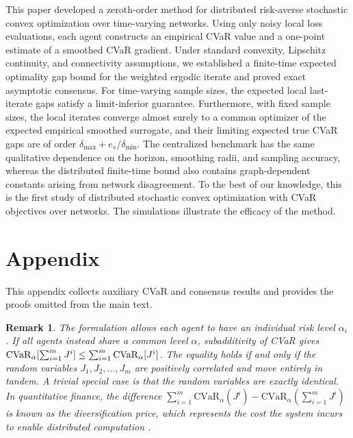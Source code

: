 \documentclass[twocolumn]{autart}    %
\newtheorem{remark}{Remark}
\newcommand{\1}{\mathbf{1}}
\begin{document}
This paper developed a zeroth-order method for distributed risk-averse stochastic convex optimization over time-varying networks. 
Using only noisy local loss evaluations, 
each agent constructs an empirical CVaR value and a one-point estimate of a smoothed CVaR gradient. 
Under standard convexity, Lipschitz continuity, and connectivity assumptions, 
we established a finite-time expected optimality gap bound for the weighted ergodic iterate and proved exact asymptotic consensus. 
For time-varying sample sizes, the expected local last-iterate gaps satisfy a limit-inferior guarantee. 
Furthermore, with fixed sample sizes, 
the local iterates converge almost surely to a common optimizer of the expected empirical smoothed surrogate, 
and their limiting expected true CVaR gaps are of order $\delta_{\max}+e_s/\delta_{\min}$.
The centralized benchmark has the same qualitative dependence on the horizon, smoothing radii, 
and sampling accuracy, 
whereas the distributed finite-time bound also contains graph-dependent constants arising from network disagreement. 
To the best of our knowledge, 
this is the first study of distributed stochastic convex optimization with CVaR objectives over networks. The simulations illustrate the efficacy of the method. %

\section{Appendix}\label{sec:appendix}
This appendix collects auxiliary CVaR and consensus results and provides the proofs omitted from the main text. 
 \begin{remark} 
 The formulation allows each agent to have an individual risk level $\alpha_i$. If all agents instead share a common level $\alpha$, subadditivity of CVaR gives ${\rm CVaR}_\alpha[\sum_{i=1}^mJ^i]\le\sum_{i=1}^m{\rm CVaR}_\alpha[J^i]$.
The equality holds if and only if the random variables $J_1, J_2, \dots, J_m$ are positively correlated and move entirely in tandem. A trivial special case is that the random variables are exactly identical.  
In quantitative finance, the difference $ \sum_{i=1}^m \text{CVaR}_\alpha(J^i) - \text{CVaR}_\alpha\left(\sum_{i=1}^m J^i\right)$ is known as the diversification price, which represents the cost the system incurs to enable distributed computation \cite{mcneil2015quantitative}.
\end{remark}
\end{document}
